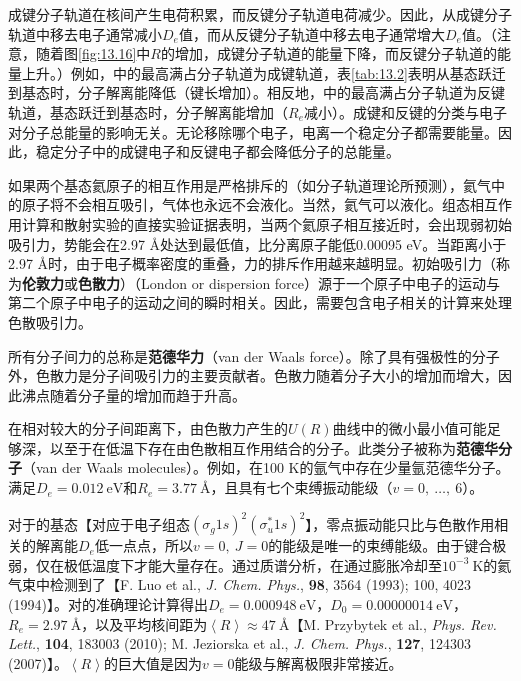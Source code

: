     成键分子轨道在核间产生电荷积累，而反键分子轨道电荷减少。因此，从成键分子轨道中移去电子通常减小$D_e$值，而从反键分子轨道中移去电子通常增大$D_e$值。（注意，随着图\ref{fig:13.16}中$R$的增加，成键分子轨道的能量下降，而反键分子轨道的能量上升。）例如，中的最高满占分子轨道为成键轨道，表\ref{tab:13.2}表明从基态跃迁到基态时，分子解离能降低（键长增加）。相反地，中的最高满占分子轨道为反键轨道，基态跃迁到基态时，分子解离能增加（$R_e$减小）。成键和反键的分类与电子对分子总能量的影响无关。无论移除哪个电子，电离一个稳定分子都需要能量。因此，稳定分子中的成键电子和反键电子都会降低分子的总能量。

    如果两个基态氦原子的相互作用是严格排斥的（如分子轨道理论所预测），氦气中的原子将不会相互吸引，气体也永远不会液化。当然，氦气可以液化。组态相互作用计算和散射实验的直接实验证据表明，当两个氦原子相互接近时，会出现弱初始吸引力，势能会在2.97 Å处达到最低值，比分离原子能低0.00095 eV。当距离小于2.97 Å时，由于电子概率密度的重叠，力的排斥作用越来越明显。初始吸引力（称为\textbf{伦敦力}或\textbf{色散力}）（London or dispersion force）源于一个原子中电子的运动与第二个原子中电子的运动之间的瞬时相关。因此，需要包含电子相关的计算来处理色散吸引力。

    所有分子间力的总称是\textbf{范德华力}（van der Waals force）。除了具有强极性的分子外，色散力是分子间吸引力的主要贡献者。色散力随着分子大小的增加而增大，因此沸点随着分子量的增加而趋于升高。

    在相对较大的分子间距离下，由色散力产生的$U\left(R\right)$曲线中的微小最小值可能足够深，以至于在低温下存在由色散相互作用结合的分子。此类分子被称为\textbf{范德华分子}（van der Waals molecules）。例如，在100 K的氩气中存在少量氩范德华分子。满足$D_e = 0.012\:\mathrm{eV}$和$R_e = 3.77\:\mathrm{Å}$，且具有七个束缚振动能级（$v = 0,\:\ldots,\:6$）。

    对于的基态【对应于电子组态$\left(\sigma_g1s\right)^2\left(\sigma_u^*1s\right)^2$】，零点振动能只比与色散作用相关的解离能$D_e$低一点点，所以$v=0,\:J=0$的能级是唯一的束缚能级。由于键合极弱，仅在极低温度下才能大量存在。通过质谱分析，在通过膨胀冷却至$10^{-3}\:\mathrm{K}$的氦气束中检测到了【F. Luo et al., \textit{J. Chem. Phys.}, \textbf{98}, 3564 (1993); 100, 4023 (1994)】。对的准确理论计算得出$D_e = 0.000948\:\mathrm{eV}$，$D_0 = 0.00000014\:\mathrm{eV}$，$R_e = 2.97\:\mathrm{Å}$，以及平均核间距为$\left\langle R \right\rangle \approx 47 \:\mathrm{Å}$【M. Przybytek et al., \textit{Phys. Rev. Lett.}, \textbf{104}, 183003 (2010); M. Jeziorska et al., \textit{J. Chem. Phys.}, \textbf{127}, 124303 (2007)】。$\left\langle R \right\rangle$的巨大值是因为$v=0$能级与解离极限非常接近。

